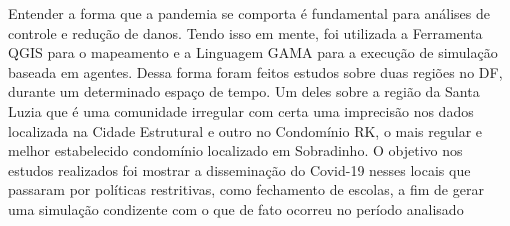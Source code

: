 
Entender a forma que a pandemia se comporta é fundamental para análises de controle e redução de danos. Tendo isso em mente, foi utilizada a Ferramenta QGIS para o mapeamento e a Linguagem GAMA para a execução de simulação baseada em agentes. Dessa forma foram feitos estudos sobre duas regiões no DF, durante um determinado espaço de tempo. Um deles sobre a região da Santa Luzia que é uma comunidade irregular com certa uma imprecisão nos dados localizada na Cidade Estrutural e outro no Condomínio RK, o mais regular e melhor estabelecido condomínio localizado em Sobradinho. O objetivo nos estudos realizados foi mostrar a disseminação do Covid-19 nesses locais que passaram por políticas restritivas, como fechamento de escolas, a fim de gerar uma simulação condizente com o que de fato ocorreu no período analisado

